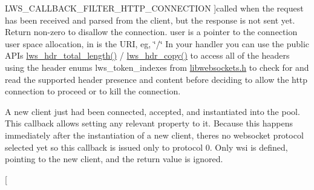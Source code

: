 \begin{Desc}
\begin{description}
{L\+W\+S\+\_\+\+C\+A\+L\+L\+B\+A\+C\+K\+\_\+\+F\+I\+L\+T\+E\+R\+\_\+\+H\+T\+T\+P\+\_\+\+C\+O\+N\+N\+E\+C\+T\+I\+ON\hypertarget{group__usercb_ggad62860e19975ba4c4af401c3cdb6abf7a75199176c82c1a56e4a6bbf1cc30c12c}{}\label{group__usercb_ggad62860e19975ba4c4af401c3cdb6abf7a75199176c82c1a56e4a6bbf1cc30c12c}
}]called when the request has been received and parsed from the client, but the response is not sent yet. Return non-\/zero to disallow the connection. user is a pointer to the connection user space allocation, in is the U\+RI, eg, \char`\"{}/\char`\"{} In your handler you can use the public A\+P\+Is \hyperlink{group__HTTP-headers-read_ga8ade0e1ffb0da7e62b989d8d867bf6c8}{lws\+\_\+hdr\+\_\+total\+\_\+length()} / \hyperlink{group__HTTP-headers-read_ga6ce6aa1c0155ea42b7708bed271d1c77}{lws\+\_\+hdr\+\_\+copy()} to access all of the headers using the header enums lws\+\_\+token\+\_\+indexes from \hyperlink{libwebsockets_8h}{libwebsockets.\+h} to check for and read the supported header presence and content before deciding to allow the http connection to proceed or to kill the connection. \item[{\em 
L\+W\+S\+\_\+\+C\+A\+L\+L\+B\+A\+C\+K\+\_\+\+S\+E\+R\+V\+E\+R\+\_\+\+N\+E\+W\+\_\+\+C\+L\+I\+E\+N\+T\+\_\+\+I\+N\+S\+T\+A\+N\+T\+I\+A\+T\+ED\hypertarget{group__usercb_ggad62860e19975ba4c4af401c3cdb6abf7ae9734e1d7af2abf291665ce9e4a728d3}{}\label{group__usercb_ggad62860e19975ba4c4af401c3cdb6abf7ae9734e1d7af2abf291665ce9e4a728d3}
}]A new client just had been connected, accepted, and instantiated into the pool. This callback allows setting any relevant property to it. Because this happens immediately after the instantiation of a new client, there\textquotesingle{}s no websocket protocol selected yet so this callback is issued only to protocol 0. Only wsi is defined, pointing to the new client, and the return value is ignored. \item[{\em 
}
\end{description}
\end{Desc}
